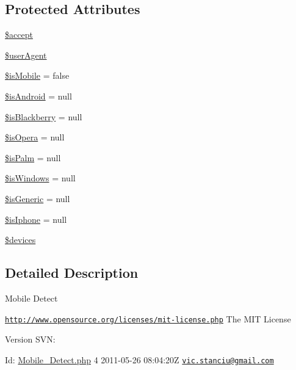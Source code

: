 \subsection*{\-Protected \-Attributes}
\begin{DoxyCompactItemize}
\item 
\hyperlink{class_mobile___detect_a75fc18c4ff06288ff9fdf8aba9bd1081}{\$accept}
\item 
\hyperlink{class_mobile___detect_a500e55626e728acd7010143dc0e56b8b}{\$user\-Agent}
\item 
\hyperlink{class_mobile___detect_a74fa6ba88f216ab9fb444f81f8e7a027}{\$is\-Mobile} = false
\item 
\hyperlink{class_mobile___detect_a77c5beaf2c0cc72bff6a6390174d9220}{\$is\-Android} = null
\item 
\hyperlink{class_mobile___detect_abc0d51b153d12a82959733849f806870}{\$is\-Blackberry} = null
\item 
\hyperlink{class_mobile___detect_aae89458b4937650ddf9ab0a1c60c9388}{\$is\-Opera} = null
\item 
\hyperlink{class_mobile___detect_a5299625c89989e6d10b38e04bb34463b}{\$is\-Palm} = null
\item 
\hyperlink{class_mobile___detect_a3fb1637ec578272acfd5cb10d0f127fd}{\$is\-Windows} = null
\item 
\hyperlink{class_mobile___detect_a22509a5976187f9d2b9a0984e3b71dd9}{\$is\-Generic} = null
\item 
\hyperlink{class_mobile___detect_ae60b238d4f4b1441a8e88dc6a444cb7e}{\$is\-Iphone} = null
\item 
\hyperlink{class_mobile___detect_a004eefb786861fbe31e1f0f24662477b}{\$devices}
\end{DoxyCompactItemize}


\subsection{\-Detailed \-Description}
\-Mobile \-Detect

\href{http://www.opensource.org/licenses/mit-license.php}{\tt http\-://www.\-opensource.\-org/licenses/mit-\/license.\-php} \-The \-M\-I\-T \-License \begin{DoxyVersion}{\-Version}
\-S\-V\-N\-: 
\end{DoxyVersion}
\begin{DoxyParagraph}{\-Id\-:}
\hyperlink{_mobile___detect_8php}{\-Mobile\-\_\-\-Detect.\-php} 4 2011-\/05-\/26 08\-:04\-:20\-Z \href{mailto:vic.stanciu@gmail.com}{\tt vic.\-stanciu@gmail.\-com} 
\end{DoxyParagraph}


